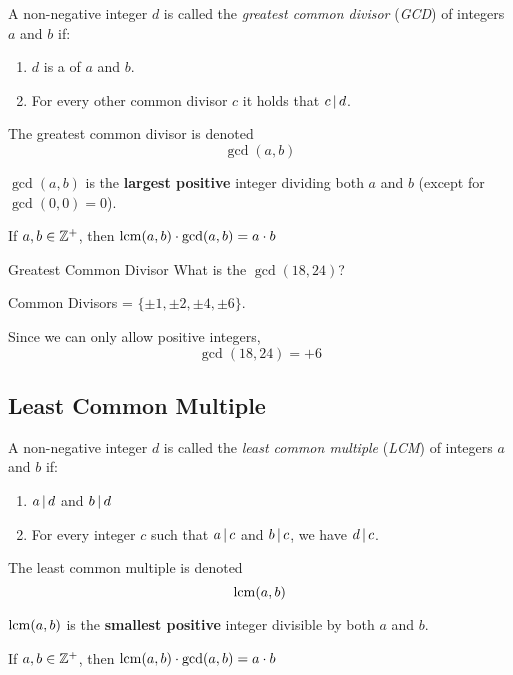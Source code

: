 \begin{definition}\label{def:GCD}
  A non-negative integer $d$ is called the \emph{greatest common divisor} (\emph{GCD}) of integers $a$ and $b$ if:
  \begin{enumerate}[noitemsep]
  \item $d$ is a  of $a$ and $b$.
  \item For every other common divisor $c$ it holds that $c \operatorname{\vert} d$.
  \end{enumerate}

  The greatest common divisor is denoted
  \begin{equation}\label{eq:GCD}
    \gcd(a, b)
  \end{equation}

  $\gcd(a,b)$ is the \textbf{largest positive} integer dividing both $a$ and $b$ (except for $\gcd(0,0)=0$).
  
  \begin{remark}
    If $a, b \in \operatorname{\mathbb{Z}^{+}}$, then $\operatorname{\operatorname{lcm}}(a, b) \cdot \gcd(a, b) = a \cdot b$
  \end{remark}
\end{definition}

\begin{example}[]{Greatest Common Divisor}
  What is the $\gcd(18, 24)$?

  \tcblower{}

  Common Divisors = $\lbrace \pm 1, \pm 2, \pm 4, \pm 6 \rbrace$.

  Since we can only allow positive integers,
  \begin{equation*}
    \gcd(18, 24) = +6
  \end{equation*}
\end{example}

\subsection{Least Common Multiple}\label{subsec:Least_Common_Multiple}
\begin{definition}\label{def:LCM}
  A non-negative integer $d$ is called the \emph{least common multiple} (\emph{LCM}) of integers $a$ and $b$ if:
  \begin{enumerate}[noitemsep]
  \item $a \operatorname{\vert} d$ and $b \operatorname{\vert} d$
  \item For every integer $c$ such that $a \operatorname{\vert} c$ and $b \operatorname{\vert} c$, we have $d \operatorname{\vert} c$.
  \end{enumerate}

  The least common multiple is denoted
  \begin{equation}\label{eq:LCM}
    \operatorname{\operatorname{lcm}}(a, b)
  \end{equation}

  $\operatorname{\operatorname{lcm}}(a, b)$ is the \textbf{smallest positive} integer divisible by both $a$ and $b$.

  \begin{remark}
    If $a, b \in \operatorname{\mathbb{Z}^{+}}$, then $\operatorname{\operatorname{lcm}}(a, b) \cdot \gcd(a, b) = a \cdot b$
  \end{remark}
\end{definition}

